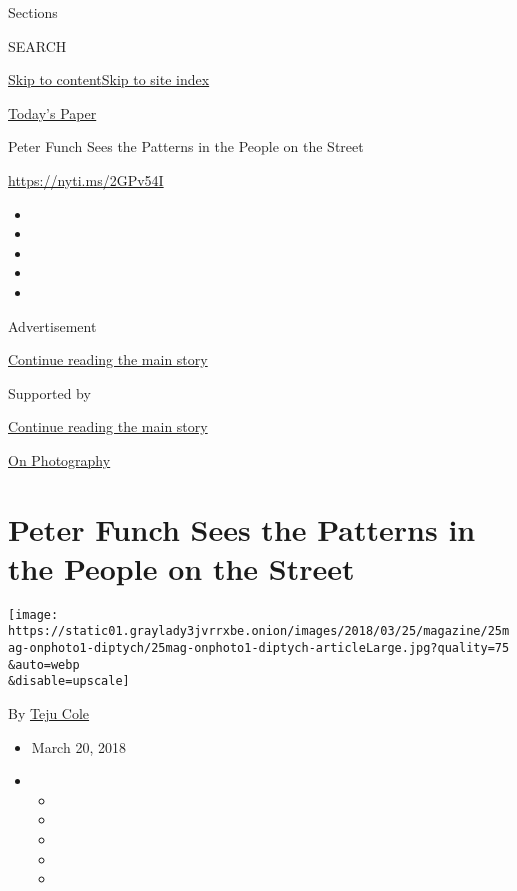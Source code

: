 Sections

SEARCH

\protect\hyperlink{site-content}{Skip to
content}\protect\hyperlink{site-index}{Skip to site index}

\href{https://myaccount.nytimes3xbfgragh.onion/auth/login?response_type=cookie\&client_id=vi}{}

\href{https://www.nytimes3xbfgragh.onion/section/todayspaper}{Today's
Paper}

Peter Funch Sees the Patterns in the People on the Street

\url{https://nyti.ms/2GPv54I}

\begin{itemize}
\item
\item
\item
\item
\item
\end{itemize}

Advertisement

\protect\hyperlink{after-top}{Continue reading the main story}

Supported by

\protect\hyperlink{after-sponsor}{Continue reading the main story}

\href{/column/on-photography}{On Photography}

\hypertarget{peter-funch-sees-the-patterns-in-the-people-on-the-street}{%
\section{Peter Funch Sees the Patterns in the People on the
Street}\label{peter-funch-sees-the-patterns-in-the-people-on-the-street}}

\texttt{[image: https://static01.graylady3jvrrxbe.onion/images/2018/03/25/magazine/25mag-onphoto1-diptych/25mag-onphoto1-diptych-articleLarge.jpg?quality=75\\\&auto=webp\\\&disable=upscale]}

By \href{https://www.nytimes3xbfgragh.onion/by/teju-cole}{Teju Cole}

\begin{itemize}
\item
  March 20, 2018
\item
  \begin{itemize}
  \item
  \item
  \item
  \item
  \item
  \end{itemize}
\end{itemize}

